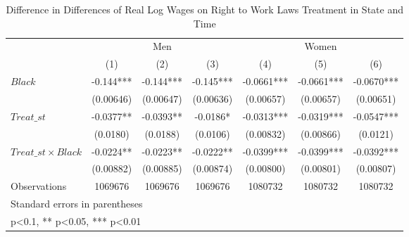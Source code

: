 \begin{table}[htbp]\centering
\def\sym#1{\ifmmode^{#1}\else\(^{#1}\)\fi}
\caption{Difference in Differences of Real Log Wages on Right to Work Laws Treatment in State and Time}
\begin{tabular}{l*{6}{c}}
\hline\hline
                    &\multicolumn{3}{c}{Men}                        &\multicolumn{3}{c}{Women}                      \\\cmidrule(lr){2-4}\cmidrule(lr){5-7}
                    &\multicolumn{1}{c}{(1)}   &\multicolumn{1}{c}{(2)}   &\multicolumn{1}{c}{(3)}   &\multicolumn{1}{c}{(4)}   &\multicolumn{1}{c}{(5)}   &\multicolumn{1}{c}{(6)}   \\
\hline
$ Black $           &      -0.144***&      -0.144***&      -0.145***&     -0.0661***&     -0.0661***&     -0.0670***\\
                    &   (0.00646)   &   (0.00647)   &   (0.00636)   &   (0.00657)   &   (0.00657)   &   (0.00651)   \\
[1em]
$ Treat\_{st} $      &     -0.0377** &     -0.0393** &     -0.0186*  &     -0.0313***&     -0.0319***&     -0.0547***\\
                    &    (0.0180)   &    (0.0188)   &    (0.0106)   &   (0.00832)   &   (0.00866)   &    (0.0121)   \\
[1em]
$ Treat\_{st} \times Black $&     -0.0224** &     -0.0223** &     -0.0222** &     -0.0399***&     -0.0399***&     -0.0392***\\
                    &   (0.00882)   &   (0.00885)   &   (0.00874)   &   (0.00800)   &   (0.00801)   &   (0.00807)   \\
\hline
Observations        &     1069676   &     1069676   &     1069676   &     1080732   &     1080732   &     1080732   \\
\hline\hline
\multicolumn{7}{l}{\footnotesize Standard errors in parentheses}\\
\multicolumn{7}{l}{\footnotesize * p<0.1, ** p<0.05, *** p<0.01}\\
\end{tabular}
\end{table}
